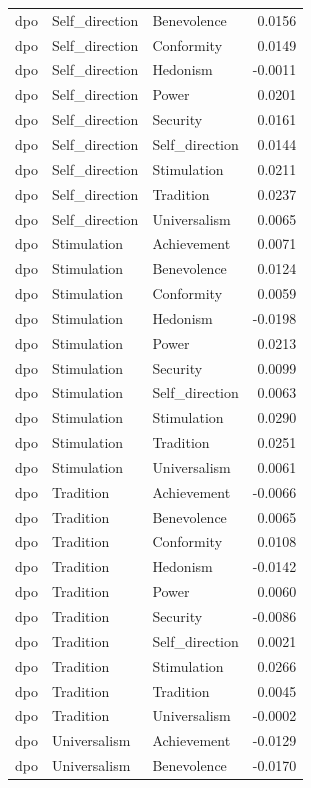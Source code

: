 \begin{tabular}{lllr}
dpo & Self\_direction & Benevolence & 0.0156 \\
dpo & Self\_direction & Conformity & 0.0149 \\
dpo & Self\_direction & Hedonism & -0.0011 \\
dpo & Self\_direction & Power & 0.0201 \\
dpo & Self\_direction & Security & 0.0161 \\
dpo & Self\_direction & Self\_direction & 0.0144 \\
dpo & Self\_direction & Stimulation & 0.0211 \\
dpo & Self\_direction & Tradition & 0.0237 \\
dpo & Self\_direction & Universalism & 0.0065 \\
dpo & Stimulation & Achievement & 0.0071 \\
dpo & Stimulation & Benevolence & 0.0124 \\
dpo & Stimulation & Conformity & 0.0059 \\
dpo & Stimulation & Hedonism & -0.0198 \\
dpo & Stimulation & Power & 0.0213 \\
dpo & Stimulation & Security & 0.0099 \\
dpo & Stimulation & Self\_direction & 0.0063 \\
dpo & Stimulation & Stimulation & 0.0290 \\
dpo & Stimulation & Tradition & 0.0251 \\
dpo & Stimulation & Universalism & 0.0061 \\
dpo & Tradition & Achievement & -0.0066 \\
dpo & Tradition & Benevolence & 0.0065 \\
dpo & Tradition & Conformity & 0.0108 \\
dpo & Tradition & Hedonism & -0.0142 \\
dpo & Tradition & Power & 0.0060 \\
dpo & Tradition & Security & -0.0086 \\
dpo & Tradition & Self\_direction & 0.0021 \\
dpo & Tradition & Stimulation & 0.0266 \\
dpo & Tradition & Tradition & 0.0045 \\
dpo & Tradition & Universalism & -0.0002 \\
dpo & Universalism & Achievement & -0.0129 \\
dpo & Universalism & Benevolence & -0.0170 \\

\end{tabular}
